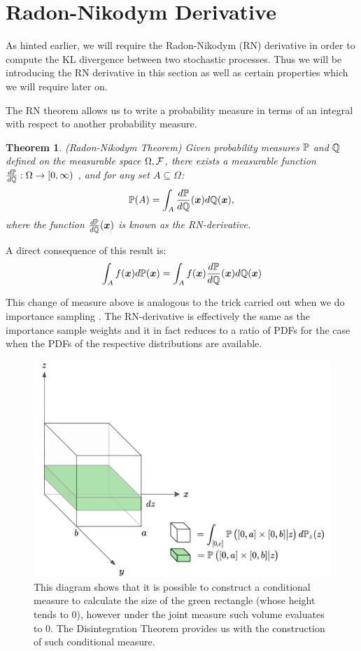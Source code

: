 \documentclass[a4paper,12pt,twoside,openright]{report}
\newtheorem{theorem}{Theorem}
\theoremstyle{definition}
\begin{document}
\section{Radon-Nikodym Derivative}

As hinted earlier, we will require the Radon-Nikodym (RN) derivative in order to compute the KL divergence between two stochastic processes. Thus we will be introducing the RN derivative in this section as well as certain properties which we will require later on.

The RN theorem allows us to write a probability measure in terms of an integral with respect to another probability measure. 

\begin{theorem}
(Radon-Nikodym Theorem)
Given probability measures $\P$ and $\Q$ defined on the measurable space $\Omega, \calF$, there exists a measurable function $\frac{d\P}{d\Q}:\Omega \rightarrow [0, \infty)$ , and for any  set $A \subseteq  \Omega$:
\begin{align}
    \P(A) = \int_{A} \frac{d\P}{d\Q}(\vx) d\Q(\vx),
\end{align}
where the function $\frac{d\P}{d\Q}(\vx)$ is known as the RN-derivative.
\end{theorem}

A direct consequence of this result is:
\begin{align*}
    \int_A f(\vx) d\P(\vx) =  \int_{A} f(\vx)  \frac{d\P}{d\Q}(\vx)  d\Q(\vx)
\end{align*}

This change of measure above is analogous to the trick carried out when we do importance sampling \citep{martino2017effective}. The RN-derivative is effectively the same as the importance sample weights and it in fact reduces to a ratio of PDFs for the case when the PDFs of the respective distributions are available.
\begin{figure}[t!]
    \centering
    \includegraphics[scale=0.3]{images/disint2.png}
    \caption{ This diagram shows that it is possible to construct a conditional measure to calculate the size of the green rectangle (whose height tends to 0), however under the joint measure such volume evaluates to $0$. The Disintegration Theorem provides us with the construction of such conditional measure.}
    \label{fig:disintegration}
\end{figure}
\end{document}

